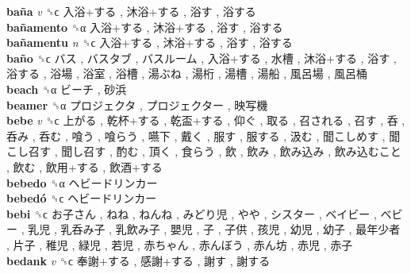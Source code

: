 \textbf{baña} \emph{v}  ␝ϲ   入浴+する ,  沐浴+する ,  浴す ,  浴する   \\
\textbf{bañamento} ␝α   入浴+する ,  沐浴+する ,  浴す ,  浴する   \\
\textbf{bañamentu} \emph{n}  ␝ϲ   入浴+する ,  沐浴+する ,  浴す ,  浴する   \\
\textbf{baño} ␝ϲ   バス ,  バスタブ ,  バスルーム ,  入浴+する ,  水槽 ,  沐浴+する ,  浴す ,  浴する ,  浴場 ,  浴室 ,  浴槽 ,  湯ぶね ,  湯桁 ,  湯槽 ,  湯船 ,  風呂場 ,  風呂桶   \\
\textbf{beach} ␝α   ビーチ ,  砂浜   \\
\textbf{beamer} ␝α   プロジェクタ ,  プロジェクター ,  映写機   \\
\textbf{bebe} \emph{v}  ␝ϲ   上がる ,  乾杯+する ,  乾盃+する ,  仰ぐ ,  取る ,  召される ,  召す ,  呑 ,  呑み ,  呑む ,  喰う ,  喰らう ,  嚥下 ,  戴く ,  服す ,  服する ,  汲む ,  聞こしめす ,  聞こし召す ,  聞し召す ,  酌む ,  頂く ,  食らう ,  飲 ,  飲み ,  飲み込み ,  飲み込むこと ,  飲む ,  飲用+する ,  飲酒+する   \\
\textbf{bebedo} ␝α   ヘビードリンカー   \\
\textbf{bebedó} ␝ϲ   ヘビードリンカー   \\
\textbf{bebi} ␝ϲ   お子さん ,  ねね ,  ねんね ,  みどり児 ,  やや ,  シスター ,  ベイビー ,  ベビー ,  乳児 ,  乳呑み子 ,  乳飲み子 ,  嬰児 ,  子 ,  子供 ,  孩児 ,  幼児 ,  幼子 ,  最年少者 ,  片子 ,  稚児 ,  緑児 ,  若児 ,  赤ちゃん ,  赤んぼう ,  赤ん坊 ,  赤児 ,  赤子   \\
\textbf{bedank} \emph{v}  ␝ϲ   奉謝+する ,  感謝+する ,  謝す ,  謝する   \\
